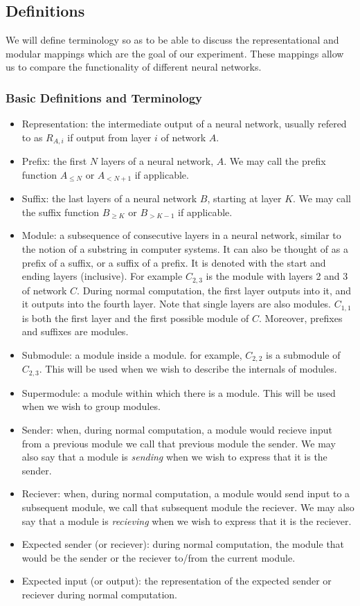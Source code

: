 \documentclass{article} %
\begin{document}
\subsection{Definitions}
We will define terminology so as to be able to discuss the representational and modular mappings
which are the goal of our experiment. These mappings allow us to compare the functionality of
different neural networks.

\subsubsection*{Basic Definitions and Terminology}
\begin{itemize}
   \item Representation: the intermediate output of a neural network, usually refered to as \(R_{A, i}\) if output from layer \(i\) of network \(A\).
   \item Prefix: the first \(N\) layers of a neural network, \(A\). We may call the prefix function \(A_{\leq N}\) or \(A_{<N+1}\) if applicable.
   \item Suffix: the last layers of a neural network \(B\), starting at layer \(K\). We may call the suffix function \(B_{\geq K}\) or \(B_{>K-1}\) if applicable.
   \item Module: a subsequence of consecutive layers in a neural network, similar to the notion of a substring in computer systems. It can also be thought of as a prefix of a suffix, or a suffix of a prefix. It is denoted with the start and ending layers (inclusive). For example \(C_{2,3}\) is the module with layers 2 and 3 of network \(C\). During normal computation, the first layer outputs into it, and it outputs into the fourth layer. Note that single layers are also modules. \(C_{1,1}\) is both the first layer and the first possible module of \(C\). Moreover, prefixes and suffixes are modules.
   \item Submodule: a module inside a module. for example, \(C_{2,2}\) is a submodule of \(C_{2,3}\). This will be used when we wish to describe the internals of modules.
   \item Supermodule: a module within which there is a module. This will be used when we wish to group modules.
   \item Sender: when, during normal computation, a module would recieve input from a previous module we call that previous module the sender. We may also say that a module is \emph{sending} when we wish to express that it is the sender.
   \item Reciever: when, during normal computation, a module would send input to a subsequent module, we call that subsequent module the reciever. We may also say that a module is \emph{recieving} when we wish to express that it is the reciever.
   \item Expected sender (or reciever): during normal computation, the module that would be the sender or the reciever to/from the current module.
   \item Expected input (or output): the representation of the expected sender or reciever during normal computation.
\end{itemize}
\end{document}
